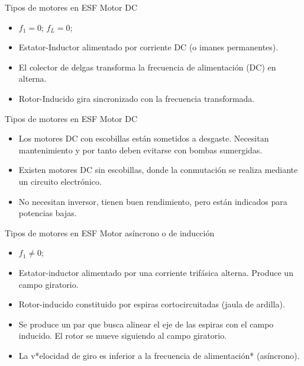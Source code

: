 \documentclass[xcolor={usenames,svgnames,dvipsnames}]{beamer}
\begin{document}
\begin{frame}[label=sec-2-1-4]{Tipos de motores en ESF}
Motor DC

\begin{itemize}
\item $f_{1}=0$; $f_{L}=0$;

\item \alert{Estator-Inductor} alimentado por \alert{corriente DC} (o imanes
permanentes).

\item El \alert{colector de delgas} transforma la frecuencia de alimentación (DC)
en alterna.

\item \alert{Rotor-Inducido gira sincronizado} con la frecuencia \guillemotleft{}transformada\guillemotright{}.
\end{itemize}
\end{frame}

\begin{frame}[label=sec-2-1-5]{Tipos de motores en ESF}
Motor DC

\begin{itemize}
\item Los \alert{motores DC con escobillas están sometidos a desgaste}. Necesitan
mantenimiento y por tanto deben evitarse con bombas sumergidas.

\item Existen \alert{motores DC sin escobillas}, donde la conmutación se realiza
mediante un \alert{circuito electrónico}.

\item No necesitan inversor, tienen buen rendimiento, pero están indicados
para \alert{potencias bajas}.
\end{itemize}
\end{frame}

\begin{frame}[label=sec-2-1-6]{Tipos de motores en ESF}
Motor asíncrono o de inducción

\begin{itemize}
\item $f_{1}\neq0$;

\item \alert{Estator-inductor} alimentado por una \alert{corriente trifásica alterna}.
Produce un campo giratorio.

\item \alert{Rotor-inducido} constituido por \alert{espiras cortocircuitadas} (jaula de
ardilla).

\item Se produce un par que busca alinear el eje de las espiras con el
campo inducido. El rotor se mueve siguiendo al campo giratorio.

\item La v*elocidad de giro es inferior a la frecuencia de alimentación*
(asíncrono).
\end{itemize}
\end{frame}
\end{document}
